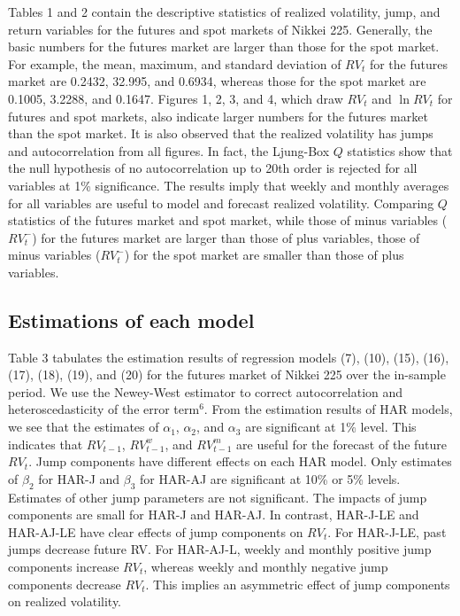 \documentclass[10pt]{article}
\begin{document}
Tables 1 and 2 contain the descriptive statistics of realized volatility, jump, and return variables for the futures and spot markets of Nikkei 225. 
Generally, the basic numbers for the futures market are larger than those for the spot market. 
For example, the mean, maximum, and standard deviation of $RV_t$ for the futures market are 0.2432, 32.995, and 0.6934, 
whereas those for the spot market are 0.1005, 3.2288, and 0.1647. 
Figures 1, 2, 3, and 4, which draw $RV_t$ and $\ln RV_t$ for futures and spot markets, also indicate larger numbers for the futures market than the spot market.  
It is also observed that the realized volatility has jumps and autocorrelation from all figures.  
In fact, the Ljung-Box $Q$ statistics show that the null hypothesis of no autocorrelation up to 20th order is rejected for all variables at 1\% significance. 
The results imply that weekly and monthly averages for all variables are useful to model and forecast realized volatility. 
Comparing $Q$ statistics of the futures market and spot market, while those of minus variables ($RV_t^{-}$) for  the futures market are larger than those of plus variables, 
those of minus variables ($RV_t^{-}$) for the spot market are smaller than those of plus variables. 

\subsection{Estimations of each model}
Table 3 tabulates the estimation results of regression models (7), (10), (15), (16), (17), (18), (19), and (20) for the futures market of Nikkei 225 over the in-sample period. 
We use the Newey-West estimator to correct autocorrelation and heteroscedasticity of the error term$^{6}$. 
From the estimation results of HAR models, we see that the estimates of $\alpha_1$, $\alpha_2$, and $\alpha_3$ are significant at 1\% level. 
This indicates that $RV_{t-1}$, $RV_{t-1}^w$, and $RV_{t-1}^m$ are useful for the forecast of the future $RV_t$.  
Jump components have different effects on each HAR model. 
Only estimates of $\beta_2$ for HAR-J and $\beta_3$ for HAR-AJ are significant at 10\% or 5\% levels. 
Estimates of other jump parameters are not significant. 
The impacts of jump components are small for HAR-J and HAR-AJ.  
In contrast, HAR-J-LE and HAR-AJ-LE have clear effects of jump components on $RV_t$. 
For HAR-J-LE, past jumps decrease future RV. 
For HAR-AJ-L, weekly and monthly positive jump components increase $RV_t$, 
whereas weekly and monthly negative jump components decrease $RV_t$. 
This implies an asymmetric effect of jump components on realized volatility. 
\end{document}
